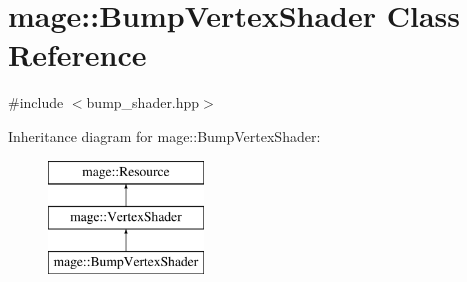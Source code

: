 \hypertarget{classmage_1_1_bump_vertex_shader}{}\section{mage\+:\+:Bump\+Vertex\+Shader Class Reference}
\label{classmage_1_1_bump_vertex_shader}


{\ttfamily \#include $<$bump\+\_\+shader.\+hpp$>$}

Inheritance diagram for mage\+:\+:Bump\+Vertex\+Shader\+:\begin{figure}[H]
\begin{center}
\leavevmode
\includegraphics[height=3.000000cm]{classmage_1_1_bump_vertex_shader}
\end{center}
\end{figure}
